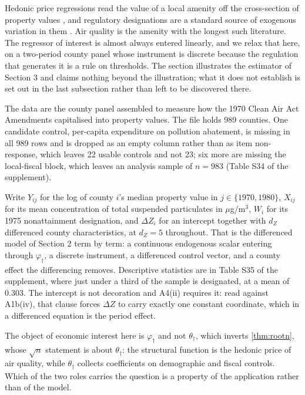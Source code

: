 \documentclass[
  12pt]{article}
\newcommand{\1}[1]{\mathds{1}\left[#1\right]}
\theoremstyle{plain}
\theoremstyle{definition}
\theoremstyle{definition}
\theoremstyle{remark}
\newcommand{\vdagger}{\varphi_{\dagger}}
\begin{document}
Hedonic price regressions read the value of a local amenity off the
cross-section of property values \citep[see][]{rosen1974,bishop2020},
and regulatory designations are a standard source of exogenous variation
in them \citep[see][]{greenstonegallagher2008}. Air quality is the
amenity with the longest such literature. The regressor of interest is
almost always entered linearly, and we relax that here, on a two-period
county panel whose instrument is discrete because the regulation that
generates it is a rule on thresholds. The section illustrates the
estimator of Section 3 and claims nothing beyond the illustration; what
it does not establish is set out in the last subsection rather than left
to be discovered there.

The data are the county panel \citet{chay2005} assembled to measure how
the 1970 Clean Air Act Amendments capitalised into property values. The
file holds 989 counties. One candidate control, per-capita expenditure
on pollution abatement, is missing in all 989 rows and is dropped as an
empty column rather than as item non-response, which leaves 22 usable
controls and not 23; six more are missing the local-fiscal block, which
leaves an analysis sample of \(n=983\) (Table S34 of the supplement).

Write \(Y_{ij}\) for the log of county \(i\)'s median property value in
\(j\in\{1970,1980\}\), \(X_{ij}\) for its mean concentration of total
suspended particulates in \(\mu\)g/m\(^3\), \(W_i\) for its 1975
nonattainment designation, and \(\Delta Z_i\) for an intercept together
with \(d_Z\) differenced county characteristics, at \(d_Z=5\)
throughout. That is the differenced model of Section 2 term by term: a
continuous endogenous scalar entering through \(\vdagger\), a discrete
instrument, a differenced control vector, and a county effect the
differencing removes. Descriptive statistics are in Table S35 of the
supplement, where just under a third of the sample is designated, at a
mean of \(0.303\). The intercept is not decoration and A4(ii) requires
it: read against A1b(iv), that clause forces \(\Delta Z\) to carry
exactly one constant coordinate, which in a differenced equation is the
period effect.

The object of economic interest here is \(\vdagger\) and not
\(\theta_\dagger\), which inverts \cref{thm:rootn}, whose \(\sqrt n\)
statement is about \(\theta_\dagger\): the structural function is the
hedonic price of air quality, while \(\theta_\dagger\) collects
coefficients on demographic and fiscal controls. Which of the two roles
carries the question is a property of the application rather than of the
model.
\end{document}
